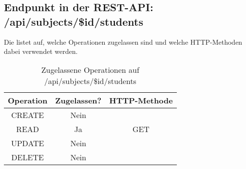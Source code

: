 \subsection{Endpunkt in der REST-API: /api/subjects/\$id/students}
Die  listet auf, welche Operationen zugelassen sind und welche HTTP-Methoden dabei verwendet werden. 

\begin{table}[!htbp]
	\begin{tabular}{|c|c|c|}
		\hline
			\textbf{Operation} & \textbf{Zugelassen?} & \textbf{HTTP-Methode} \\ \hline
			CREATE & Nein & \\ \hline 
			READ & Ja & GET \\ \hline
			UPDATE & Nein & \\ \hline 
			DELETE & Nein & \\ \hline
	\end{tabular}

		\caption{Zugelassene Operationen auf /api/subjects/\$id/students}
		\label{tab:rest:api:subjects:id:students:meth}
\end{table}

